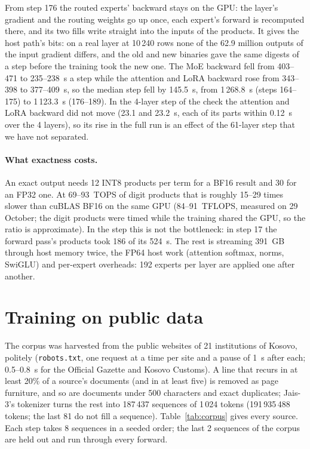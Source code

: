 \documentclass[11pt]{article}
\begin{document}
From step 176 the routed experts' backward stays on the GPU: the layer's gradient and the routing weights go up once, each
expert's forward is recomputed there, and its two fills write straight into the inputs of the products. It gives the host
path's bits: on a real layer at 10\,240 rows none of the 62.9 million outputs of the input gradient differs, and the old and
new binaries gave the same digests of a step before the training took the new one. The MoE backward fell from 403--471 to
235--238~s a step while the attention and LoRA backward rose from 343--398 to 377--409~s, so the median step fell by 145.5~s,
from 1\,268.8~s (steps 164--175) to 1\,123.3~s (176--189). In the 4-layer step of the check the attention and LoRA
backward did not move (23.1 and 23.2~s, each of its parts within 0.12~s over the 4 layers), so its rise in the full run is an effect of the
61-layer step that we have not separated.

\paragraph{What exactness costs.} An exact output needs 12 INT8 products per term for a BF16 result and 30 for an FP32 one. At
69--93~TOPS of digit products that is roughly 15--29 times slower than cuBLAS BF16 on the same GPU (84--91~TFLOPS, measured on
29 October; the digit products were timed while the training shared the GPU, so the ratio is approximate). In the step this is not the
bottleneck: in step 17 the forward pass's products took 186 of its 524~s. The rest is streaming 391~GB through host memory
twice, the FP64 host work (attention softmax, norms, SwiGLU) and per-expert overheads: 192 experts per layer are applied one
after another.

\section{Training on public data}\label{sec:train}

{\sloppy The corpus was harvested from the public websites of 21 institutions of Kosovo, politely (\texttt{robots.txt}, one request
at a time per site and a pause of 1~s after each; 0.5--0.8~s for the Official Gazette and Kosovo Customs). A line that recurs
in at least 20\% of a source's documents (and in
at least five) is removed as page furniture, and so are documents under 500 characters and exact duplicates; Jais-3's
tokenizer turns the rest into 187\,437 sequences of 1\,024 tokens (191\,935\,488 tokens; the last 81 do not fill a sequence).
Table~\ref{tab:corpus} gives every source. Each step takes 8 sequences in a seeded order; the last 2 sequences of the corpus
are held out and run through every forward.\par}
\end{document}
